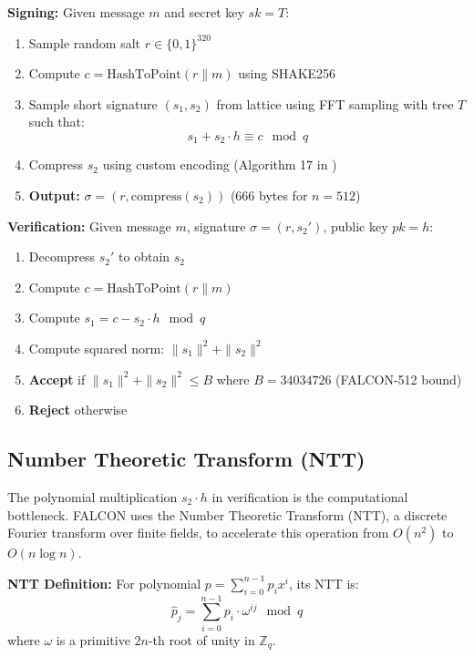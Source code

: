 \textbf{Signing:} Given message $m$ and secret key $sk = T$:
\begin{enumerate}
    \item Sample random salt $r \in \{0,1\}^{320}$
    \item Compute $c = \text{HashToPoint}(r \| m)$ using SHAKE256
    \item Sample short signature $(s_1, s_2)$ from lattice using FFT sampling with tree $T$ such that:
    \begin{equation}
    s_1 + s_2 \cdot h \equiv c \mod q
    \end{equation}
    \item Compress $s_2$ using custom encoding (Algorithm 17 in \cite{falcon2020})
    \item \textbf{Output:} $\sigma = (r, \text{compress}(s_2))$ (666 bytes for $n=512$)
\end{enumerate}

\textbf{Verification:} Given message $m$, signature $\sigma = (r, s_2')$, public key $pk = h$:
\begin{enumerate}
    \item Decompress $s_2'$ to obtain $s_2$
    \item Compute $c = \text{HashToPoint}(r \| m)$
    \item Compute $s_1 = c - s_2 \cdot h \mod q$
    \item Compute squared norm: $\|s_1\|^2 + \|s_2\|^2$
    \item \textbf{Accept} if $\|s_1\|^2 + \|s_2\|^2 \leq B$ where $B = 34034726$ (FALCON-512 bound)
    \item \textbf{Reject} otherwise
\end{enumerate}

\subsection{Number Theoretic Transform (NTT)}

The polynomial multiplication $s_2 \cdot h$ in verification is the computational bottleneck. FALCON uses the Number Theoretic Transform (NTT), a discrete Fourier transform over finite fields, to accelerate this operation from $O(n^2)$ to $O(n \log n)$.

\textbf{NTT Definition:} For polynomial $p = \sum_{i=0}^{n-1} p_i x^i$, its NTT is:
\begin{equation}
\hat{p}_j = \sum_{i=0}^{n-1} p_i \cdot \omega^{ij} \mod q
\end{equation}
where $\omega$ is a primitive $2n$-th root of unity in $\mathbb{Z}_q$.

